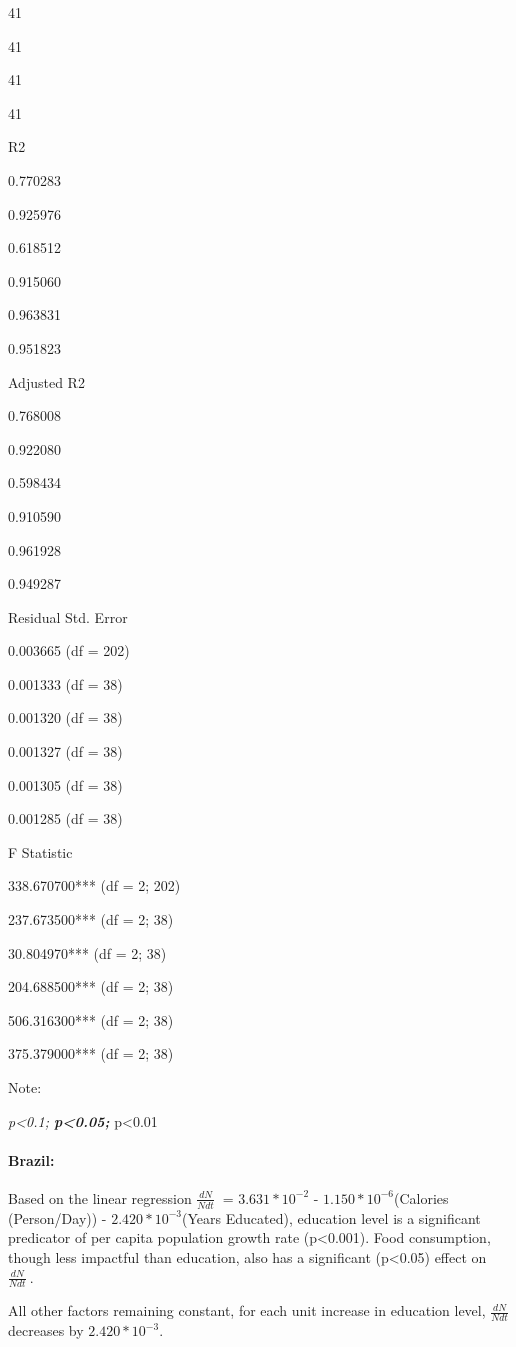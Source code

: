 \documentclass[]{article}
\let\oldparagraph\paragraph
\renewcommand{\paragraph}[1]{\oldparagraph{#1}\mbox{}}
\begin{document}
41

41

41

41

R2

0.770283

0.925976

0.618512

0.915060

0.963831

0.951823

Adjusted R2

0.768008

0.922080

0.598434

0.910590

0.961928

0.949287

Residual Std. Error

0.003665 (df = 202)

0.001333 (df = 38)

0.001320 (df = 38)

0.001327 (df = 38)

0.001305 (df = 38)

0.001285 (df = 38)

F Statistic

338.670700*** (df = 2; 202)

237.673500*** (df = 2; 38)

30.804970*** (df = 2; 38)

204.688500*** (df = 2; 38)

506.316300*** (df = 2; 38)

375.379000*** (df = 2; 38)

Note:

\emph{p\textless{}0.1; \textbf{p\textless{}0.05; }}p\textless{}0.01

\paragraph{Brazil:}\label{brazil-1}

Based on the linear regression \(\frac{dN}{Ndt}\ \) = \(3.631*10^{-2}\)
- \(1.150*10^{-6}\)(Calories (Person/Day)) - \(2.420*10^{-3}\)(Years
Educated), education level is a significant predicator of per capita
population growth rate (p\textless{}0.001). Food consumption, though
less impactful than education, also has a significant (p\textless{}0.05)
effect on \(\frac{dN}{Ndt}\ \).

All other factors remaining constant, for each unit increase in
education level, \(\frac{dN}{Ndt}\ \) decreases by \(2.420*10^{-3}\).
\end{document}
